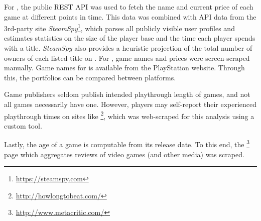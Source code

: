 For \steam, the public \acrshort{REST} \acrshort{API} was used to
fetch the name and current price of each game at different points in
time. This
data was combined with \acrshort{API} data from the 3rd-party site
\textit{SteamSpy}\footnote{\url{https://steamspy.com}}, which parses all
publicly visible \steam user profiles and
estimates statistics on the size of the player base and the time each
player spends with a title. \textit{SteamSpy} also provides a heuristic
projection of the total number of owners of each listed title on \steam.
For \gfnow, game names and prices were screen-scraped manually.
Game names for \psnow is available from the PlayStation
website.
Through this, the portfolios can be compared between platforms.

Game publishers seldom publish intended playthrough
length of games, and not all games necessarily have one. However, players
may self-report their experienced playthrough times on sites like
\hltb\footnote{\url{http://howlongtobeat.com/}}, which was web-scraped
for this analysis using a custom tool.


Lastly, the age of a game is computable from its release date. To this end, the
\metacritic\footnote{\url{http://www.metacritic.com/}} page which
aggregates reviews of video games (and other media) was
scraped.


